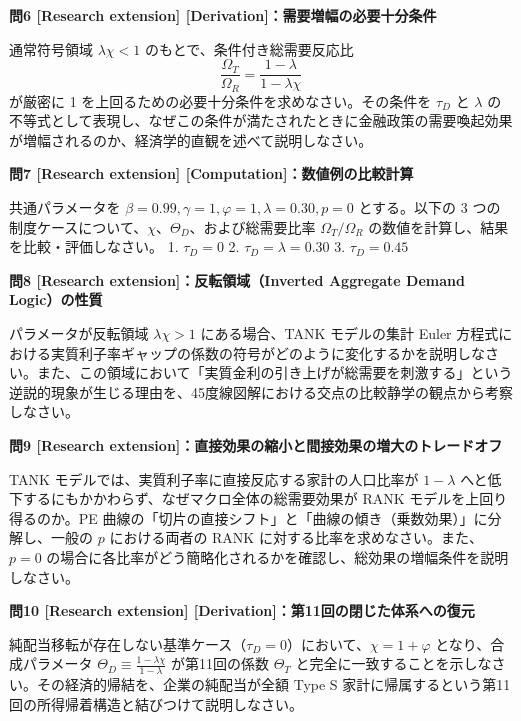 \documentclass[
  japanese,
  lualatex,
  ja=standard,
  12pt,
  a4paper]{ltjsarticle}
\begin{document}

\textbf{問6 {[}Research extension{]}
{[}Derivation{]}：需要増幅の必要十分条件}

通常符号領域 \(\lambda\chi < 1\) のもとで、条件付き総需要反応比 \[
\frac{\Omega_T}{\Omega_R} = \frac{1-\lambda}{1-\lambda\chi}
\] が厳密に 1 を上回るための必要十分条件を求めなさい。その条件を
\(\tau_D\) と \(\lambda\)
の不等式として表現し、なぜこの条件が満たされたときに金融政策の需要喚起効果が増幅されるのか、経済学的直観を述べて説明しなさい。


\textbf{問7 {[}Research extension{]}
{[}Computation{]}：数値例の比較計算}

共通パラメータを \(\beta=0.99, \gamma=1, \varphi=1, \lambda=0.30, p=0\)
とする。以下の 3
つの制度ケースについて、\(\chi\)、\(\Theta_D\)、および総需要比率
\(\Omega_T / \Omega_R\) の数値を計算し、結果を比較・評価しなさい。 1.
\(\tau_D = 0\) 2. \(\tau_D = \lambda = 0.30\) 3. \(\tau_D = 0.45\)


\textbf{問8 {[}Research extension{]}：反転領域（Inverted Aggregate
Demand Logic）の性質}

パラメータが反転領域 \(\lambda\chi > 1\) にある場合、TANK モデルの集計
Euler
方程式における実質利子率ギャップの係数の符号がどのように変化するかを説明しなさい。また、この領域において「実質金利の引き上げが総需要を刺激する」という逆説的現象が生じる理由を、45度線図解における交点の比較静学の観点から考察しなさい。


\textbf{問9 {[}Research
extension{]}：直接効果の縮小と間接効果の増大のトレードオフ}

TANK モデルでは、実質利子率に直接反応する家計の人口比率が \(1-\lambda\)
へと低下するにもかかわらず、なぜマクロ全体の総需要効果が RANK
モデルを上回り得るのか。PE
曲線の「切片の直接シフト」と「曲線の傾き（乗数効果）」に分解し、一般の
\(p\) における両者の RANK に対する比率を求めなさい。また、\(p=0\)
の場合に各比率がどう簡略化されるかを確認し、総効果の増幅条件を説明しなさい。


\textbf{問10 {[}Research extension{]}
{[}Derivation{]}：第11回の閉じた体系への復元}

純配当移転が存在しない基準ケース（\(\tau_D = 0\)）において、\(\chi = 1+\varphi\)
となり、合成パラメータ
\(\Theta_D \equiv \frac{1-\lambda\chi}{1-\lambda}\) が第11回の係数
\(\Theta_T\)
と完全に一致することを示しなさい。その経済的帰結を、企業の純配当が全額
Type S
家計に帰属するという第11回の所得帰着構造と結びつけて説明しなさい。
\end{document}
